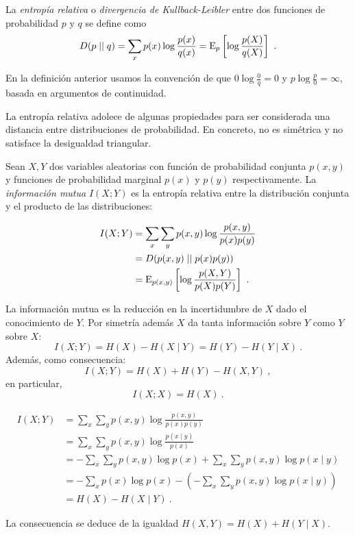 La \emph{entropía relativa} o \emph{divergencia de Kullback-Leibler}
entre dos funciones de probabilidad \(p\) y \(q\) se define como
\[D(p\mid\mid q)=\sum_{x}p(x)\log\frac{p(x)}{q(x)}=\mathrm{E}_{p}\left[\log\frac{p(X)}{q(X)}\right]~.\]

En la definición anterior usamos la convención de que
\(0\log\frac 0 q=0\) y \(p\log\frac p 0=\infty\), basada en argumentos
de continuidad.

La entropía relativa adolece de algunas propiedades para ser considerada
una distancia entre distribuciones de probabilidad. En concreto, no es
simétrica y no satisface la desigualdad triangular.

Sean \(X, Y\) dos variables aleatorias con función de probabilidad
conjunta \(p(x,y)\) y funciones de probabilidad marginal \(p(x)\) y
\(p(y)\) respectivamente. La \emph{información mutua} \(I(X;Y)\) es la
entropía relativa entre la distribución conjunta y el producto de las
distribuciones:

\begin{align*}
  I(X;Y)&=\sum_{x}\sum_{y}p(x,y)\log\frac{p(x,y)}{p(x)p(y)}\\
        &=D(p(x,y)\mid\mid p(x)p(y))\\
        &=\mathrm{E}_{p(x,y)}\left[\log\frac{p(X,Y)}{p(X)p(Y)}\right]~.
\end{align*}


\theob
La información mutua es la reducción en la incertidumbre de \(X\) dado
el conocimiento de \(Y\). Por simetría además \(X\) da tanta información
sobre \(Y\) como \(Y\) sobre \(X\):
\[I(X;Y)=H(X)-H(X\mid Y)=H(Y)-H(Y\mid X)~.\] Además, como consecuencia:
\[I(X;Y)=H(X)+H(Y)-H(X,Y)~,\] en particular, \[I(X;X)=H(X)~.\] \proofb

\begin{align*}
  I(X;Y)&=\sum_{x}\sum_{y}p(x,y)\log\frac{p(x,y)}{p(x)p(y)}\\
        &=\sum_{x}\sum_{y}p(x,y)\log\frac{p(x\mid y)}{p(x)}\\
        &=-\sum_{x}\sum_{y}p(x,y)\log p(x) + \sum_{x}\sum_{y}p(x,y)\log p(x\mid y)\\
        &=-\sum_{x}p(x)\log p(x) -\left(- \sum_{x}\sum_{y}p(x,y)\log p(x\mid y)\right)\\
        &=H(X)-H(X\mid Y)~.
\end{align*}

La consecuencia se deduce de la igualdad \(H(X,Y)=H(X)+H(Y\mid X)\).
\proofe

